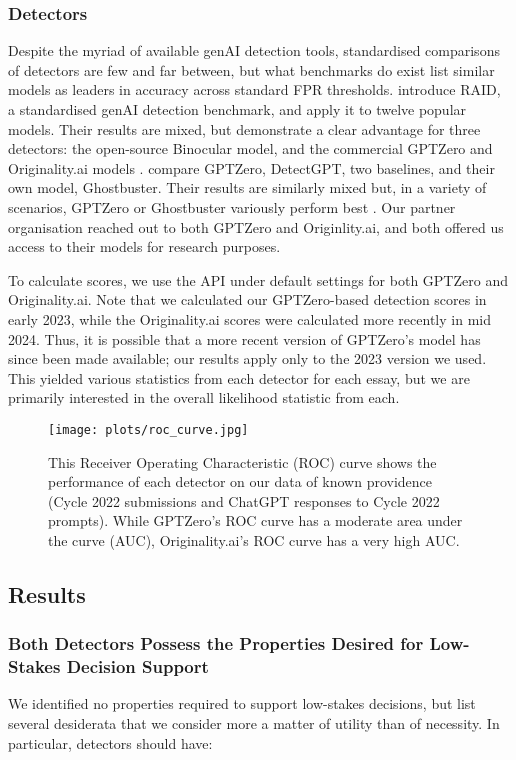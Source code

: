 \subsubsection{Detectors}\label{sssec:detectors}
Despite the myriad of available genAI detection tools, standardised comparisons of detectors are few and far between, but what benchmarks do exist list similar models as leaders in accuracy across standard FPR thresholds. \textcite{dugan_raid_2024} introduce RAID, a standardised genAI detection benchmark, and apply it to twelve popular models. Their results are mixed, but demonstrate a clear advantage for three detectors: the open-source Binocular model, and the commercial GPTZero and Originality.ai models \cite{dugan_raid_2024}. \textcite{verma_ghostbuster_2023} compare GPTZero, DetectGPT, two baselines, and their own model, Ghostbuster. Their results are similarly mixed but, in a variety of scenarios, GPTZero or Ghostbuster variously perform best \cite{verma_ghostbuster_2023} . Our partner organisation reached out to both GPTZero and Originlity.ai, and both offered us access to their models for research purposes.

To calculate scores, we use the API under default settings for both GPTZero and Originality.ai. Note that we calculated our GPTZero-based detection scores in early 2023, while the Originality.ai scores were calculated more recently in mid 2024. Thus, it is possible that a more recent version of GPTZero's model has since been made available; our results apply only to the 2023 version we used. This yielded various statistics from each detector for each essay, but we are primarily interested in the overall likelihood statistic from each.

\begin{figure}[htb]
  \centering
  \texttt{[image: plots/roc\_curve.jpg]}
  \caption{This Receiver Operating Characteristic (ROC) curve shows the performance of each detector on our data of known providence (Cycle 2022 submissions and ChatGPT responses to Cycle 2022 prompts). While GPTZero's ROC curve has a moderate area under the curve (AUC), Originality.ai's ROC curve has a very high AUC.}
  \label{fig:roc_auc}
\end{figure}

\subsection{Results}
\subsubsection{Both Detectors Possess the Properties Desired for Low-Stakes Decision Support}
We identified no properties required to support low-stakes decisions, but list several desiderata that we consider more a matter of utility than of necessity. In particular, detectors should have:

